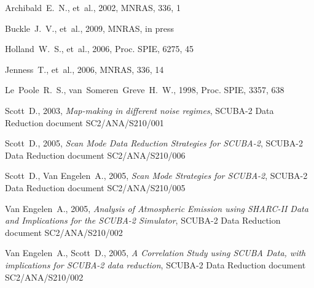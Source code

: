 \documentclass[twoside,11pt]{article}
\newcommand{\xref}[3]{#1}
\renewcommand{\_}{\texttt{\symbol{95}}}
\begin{document}
\begin{thebibliography}{}

Archibald~E.~N., et~al., 2002, MNRAS, 336, 1

Buckle~J.~V., et~al., 2009, MNRAS, in press




Holland~W.~S., et~al., 2006, Proc. SPIE, 6275, 45

Jenness~T., et~al., 2006, MNRAS, 336, 14

Le~Poole~R.~S., van~Someren~Greve~H.~W., 1998, Proc. SPIE, 3357, 638

Scott~D., 2003, {\it Map-making in different noise regimes}, SCUBA-2
  Data Reduction document SC2/ANA/S210/001

Scott~D., 2005, {\it Scan Mode Data Reduction Strategies for
  SCUBA-2}, SCUBA-2 Data Reduction document SC2/ANA/S210/006

Scott~D., Van Engelen~A., 2005, {\it Scan Mode Strategies for
  SCUBA-2}, SCUBA-2 Data Reduction document SC2/ANA/S210/005

Van Engelen~A., 2005, {\it Analysis of Atmospheric Emission using
  SHARC-II Data and Implications for the SCUBA-2 Simulator},
  SCUBA-2 Data Reduction document SC2/ANA/S210/002

Van Engelen~A., Scott~D., 2005, {\it A Correlation Study using SCUBA
  Data, with implications for SCUBA-2 data reduction},
  SCUBA-2 Data Reduction document SC2/ANA/S210/002



\end{thebibliography}
\end{document}
